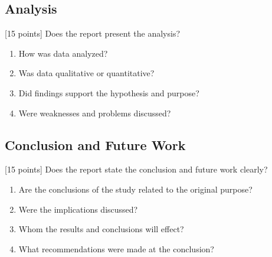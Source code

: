 \documentclass{winslabreport}
\begin{document}
\subsection{Analysis}
[15 points] Does the report present the analysis?
\begin{enumerate}
    \item How was data analyzed?
    \item Was data qualitative or quantitative?
    \item Did findings support the hypothesis and purpose?
    \item Were weaknesses and problems discussed?
\end{enumerate}

\subsection{Conclusion and Future Work}
[15 points] Does the report state the conclusion and future work clearly?
\begin{enumerate}
    \item Are the conclusions of the study related to the original purpose?
    \item Were the implications discussed?
    \item Whom the results and conclusions will effect?
    \item What recommendations were made at the conclusion?
\end{enumerate}
\end{document}
